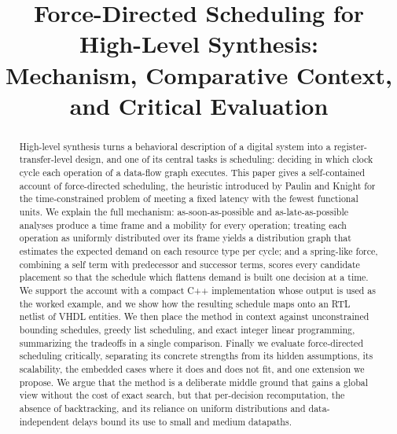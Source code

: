 \documentclass[conference]{IEEEtran}
\begin{document}
\title{Force-Directed Scheduling for High-Level Synthesis:\\
Mechanism, Comparative Context, and Critical Evaluation}

\author{
}

\maketitle
\thispagestyle{plain}
\pagestyle{plain}

\begin{abstract}
High-level synthesis turns a behavioral description of a digital system into a register-transfer-level design, and one of its central tasks is scheduling: deciding in which clock cycle each operation of a data-flow graph executes. This paper gives a self-contained account of force-directed scheduling, the heuristic introduced by Paulin and Knight for the time-constrained problem of meeting a fixed latency with the fewest functional units. We explain the full mechanism: as-soon-as-possible and as-late-as-possible analyses produce a time frame and a mobility for every operation; treating each operation as uniformly distributed over its frame yields a distribution graph that estimates the expected demand on each resource type per cycle; and a spring-like force, combining a self term with predecessor and successor terms, scores every candidate placement so that the schedule which flattens demand is built one decision at a time. We support the account with a compact C++ implementation whose output is used as the worked example, and we show how the resulting schedule maps onto an RTL netlist of VHDL entities. We then place the method in context against unconstrained bounding schedules, greedy list scheduling, and exact integer linear programming, summarizing the tradeoffs in a single comparison. Finally we evaluate force-directed scheduling critically, separating its concrete strengths from its hidden assumptions, its scalability, the embedded cases where it does and does not fit, and one extension we propose. We argue that the method is a deliberate middle ground that gains a global view without the cost of exact search, but that per-decision recomputation, the absence of backtracking, and its reliance on uniform distributions and data-independent delays bound its use to small and medium datapaths.
\end{abstract}
\end{document}
